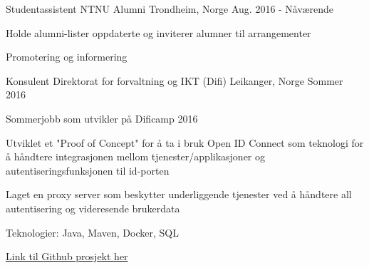 \begin{cventries}

  \cventry
    {Studentassistent}
    {NTNU Alumni}
    {Trondheim, Norge}
    {Aug. 2016 - Nåværende}
    {
      \begin{cvitems}
        \item {Holde alumni-lister oppdaterte og inviterer alumner til arrangementer}
        \item {Promotering og informering}
      \end{cvitems}
    }

  \cventry
    {Konsulent}
    {Direktorat for forvaltning og IKT (Difi)}
    {Leikanger, Norge}
    {Sommer 2016}
    {
      \begin{cvitems}
        \item {Sommerjobb som utvikler på Dificamp 2016}
        \item {Utviklet et "Proof of Concept" for å ta i bruk Open ID Connect som teknologi for å håndtere integrasjonen mellom tjenester/applikasjoner og autentiseringsfunksjonen til id-porten}
        \item {Laget en proxy server som beskytter underliggende tjenester ved å håndtere all autentisering og videresende brukerdata}
        \item {Teknologier: Java, Maven, Docker, SQL}
        \item {\href{https://github.com/difi/dc16-oidc-proxy}{Link til Github prosjekt her}}
      \end{cvitems}
    }
  

\end{cventries}
